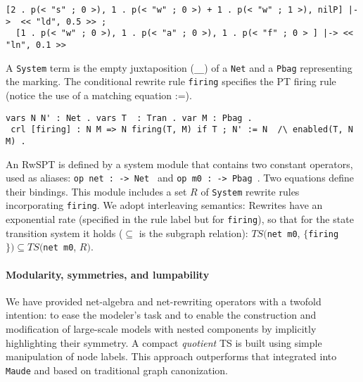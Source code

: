 {\small\begin{lstlisting}[frame=single,language=maude]
  [2 . p(< "s" ; 0 >), 1 . p(< "w" ; 0 >) + 1 . p(< "w" ; 1 >), nilP] |->  << "ld", 0.5 >> ;
  [1 . p(< "w" ; 0 >), 1 . p(< "a" ; 0 >), 1 . p(< "f" ; 0 > ] |-> << "ln", 0.1 >>
\end{lstlisting}}

A \verb|System| term is the empty juxtaposition (\verb|__|) of a \verb|Net| and a \verb|Pbag| representing the marking. 
The conditional rewrite rule \verb|firing| specifies the PT firing rule
(notice the use of a matching equation :=).

{\small\begin{lstlisting}[frame=single,language=maude]
 vars N N' : Net . vars T  : Tran . var M : Pbag .
 crl [firing] : N M => N firing(T, M) if T ; N' := N  /\ enabled(T, N M) . 
\end{lstlisting}}


An RwSPT is defined by a system module that contains two constant operators, used as aliases:
\verb|op net : -> Net | and \verb|op m0 : -> Pbag |.
Two equations define their bindings.
This module includes a set $R$ of \verb|System| rewrite rules incorporating \verb|firing|.
We adopt interleaving semantics: Rewrites 
have an exponential rate (specified in the rule label but for \verb|firing|), so that for the state transition system it holds ($\subseteq$ is the subgraph relation):
$TS($\verb|net m0|, $\{$\verb|firing|$\}) \subseteq TS($\verb|net m0|, $R)$.

\vspace{-11pt}
\paragraph{Modularity, symmetries, and lumpability} We have provided net-algebra and net-rewriting operators \cite{CAPRA-TCS2024} with a twofold intention: to ease the modeler's task and to enable the construction and modification of large-scale models with nested components by implicitly highlighting their symmetry.
A compact \emph{quotient} TS is built using simple manipulation of node labels.
This approach outperforms that integrated into \texttt{Maude} \cite{Capra:RP22} and based on traditional graph canonization.

